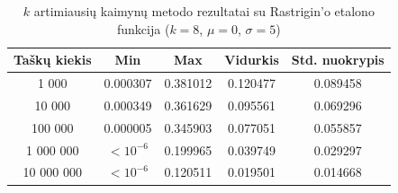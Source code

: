 \begin{table}[H]
    \centering
    \begin{tabular}{|c|c|c|c|c|}
        \hline
        \textbf{Taškų kiekis} & \textbf{Min} & \textbf{Max} & \textbf{Vidurkis} & \textbf{Std. nuokrypis} \\ \hline
        1 000        & 0.000307 & 0.381012 & 0.120477 & 0.089458 \\ \hline
        10 000       & 0.000349 & 0.361629 & 0.095561 & 0.069296 \\ \hline
        100 000      & 0.000005 & 0.345903 & 0.077051 & 0.055857 \\ \hline
        1 000 000    & $<10^{-6}$ & 0.199965 & 0.039749 & 0.029297 \\ \hline
        10 000 000   & $<10^{-6}$ & 0.120511 & 0.019501 & 0.014668 \\ \hline
    \end{tabular}
    \caption{$k$ artimiausių kaimynų metodo rezultatai su Rastrigin'o etalono funkcija ($k = 8$, $\mu = 0$, $\sigma = 5$)}
\end{table}